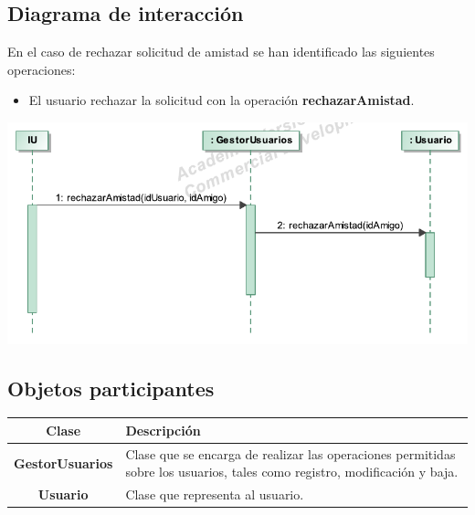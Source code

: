 \documentclass[12pt, a4paper, titlepage]{article}
\begin{document}
\subsection{Diagrama de interacción}
En el caso de {\sc rechazar solicitud de amistad } se han identificado las siguientes operaciones:

\begin{itemize}
	\item El usuario rechazar la solicitud con la operación \textbf{rechazarAmistad}.
\end{itemize}

\begin{center}
	\includegraphics{Imagenes/OperacionRechazarAmistad}
\end{center}

\subsection{Objetos participantes}
\begin{center}

\begin{tabular}{|c|p{14cm}|}
	\hline
	\textbf{Clase} & \textbf{Descripción}\\ \hline
	\textbf{GestorUsuarios} &  Clase que se encarga de realizar las operaciones permitidas sobre los usuarios, tales como registro, modificación y baja.\\ \hline
	\textbf{Usuario} & Clase que representa al usuario. \\ \hline
\end{tabular}

\end{center}
\end{document}
